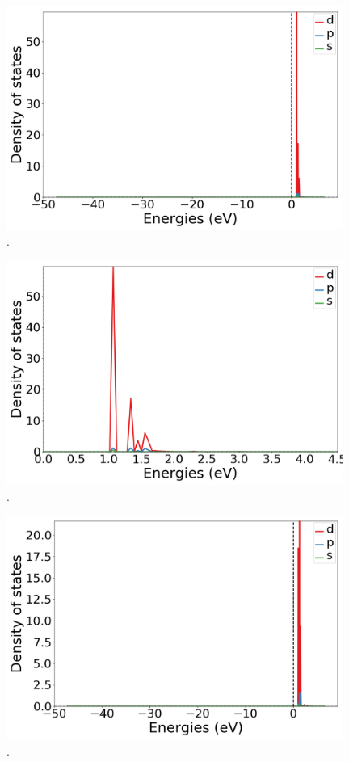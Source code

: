 \documentclass{article}
\begin{document}
  \begin{figure}[H]
      \centering
      \includegraphics[width = 11cm]{../fig/Y_k4_LDOS25_1.png}
      \caption{. }
      \label{fig:Y_k4_LDOS25_1.png}
  \end{figure}

  \begin{figure}[H]
      \centering
      \includegraphics[width = 11cm]{../fig/Y_k4_LDOS25_2.png}
      \caption{. }
      \label{fig:Y_k4_LDOS25_2.png}
  \end{figure}

  \begin{figure}[H]
      \centering
      \includegraphics[width = 11cm]{../fig/Y_k4_LDOS26_1.png}
      \caption{. }
      \label{fig:Y_k4_LDOS26_1.png}
  \end{figure}
\end{document}
